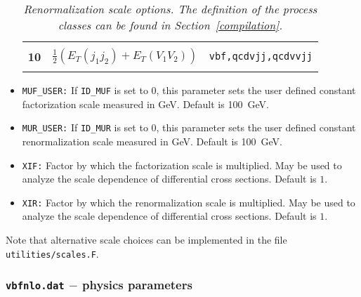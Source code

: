 \documentclass[english,12pt]{article}
\begin{document}
\begin{itemize}
\begin{table}[t!]
\begin{center}
\begin{tabular}{c|p{7.5cm}|c}
 & & \\
\multirow{2}{*}{\bf 10} & \multirow{2}{*}{$\frac{1}{2} \left( E_T(j_1j_2) + E_T(V_1 V_2) \right)$} & \multirow{2}{*}{\tt vbf,qcdvjj,qcdvvjj}  \\
 & & \\
&&\\
\hline
\end{tabular}
\caption {\em Renormalization scale options. The definition of the process classes can be found in Section~\ref{compilation}.}
\vspace{0.2cm}
\label{tab:rscales}
\end{center}
\end{table}
%
%
\item {\tt MUF\_USER:} If {\tt ID\_MUF} is set to 0, this parameter sets the
user defined constant factorization scale measured in GeV. Default is 100~GeV.
\item {\tt MUR\_USER:} If {\tt ID\_MUR} is set to 0, this parameter sets the
user defined constant renormalization scale measured in GeV. Default is 100~GeV.
\item {\tt XIF:} Factor by which the factorization scale is multiplied. May be
used to analyze the scale dependence of differential cross sections. Default is
$1$.
\item {\tt XIR:} Factor by which the renormalization scale is multiplied. May be
used to analyze the scale dependence of differential cross sections. Default is
$1$.
\end{itemize}
Note that alternative scale choices can be implemented in the file {\tt utilities/scales.F}.



\subsubsection{{\tt vbfnlo.dat} $-$ physics parameters}
\label{sec:physics}
\end{document}
